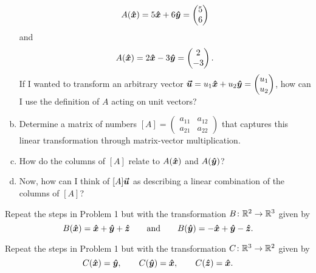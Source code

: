 \documentclass[12pt]{article} %
\begin{document}
\begin{problem}
\begin{enumerate}[(a)]
\[            A(\boldsymbol{\hat{x}}) = 5 \boldsymbol{\hat{x}} + 6\boldsymbol{\hat{y}} = \begin{pmatrix} 5 \\ 6 \end{pmatrix}
        \]
        and
        \[
            A(\boldsymbol{\hat{x}}) = 2 \boldsymbol{\hat{x}} - 3 \boldsymbol{\hat{y}} = \begin{pmatrix} 2 \\ -3 \end{pmatrix}.
        \]
        If I wanted to transform an arbitrary vector $\boldsymbol{\boldsymbol{\vec{u}}} = u_1 \boldsymbol{\hat{x}} + u_2 \boldsymbol{\hat{y}} = \begin{pmatrix} u_1 \\ u_2 \end{pmatrix}$, how can I use the definition of $A$ acting on unit vectors?
        \item Determine a matrix of numbers $[A] = \begin{pmatrix} a_{11} & a_{12} \\ a_{21} & a_{22} \end{pmatrix}$ that captures this linear transformation through matrix-vector multiplication. 
        \item How do the columns of $[A]$ relate to $A(\boldsymbol{\hat{x}})$ and $A(\boldsymbol{\hat{y}})$?
        \item Now, how can I think of $[A]\boldsymbol{\boldsymbol{\vec{u}}}$ as describing a linear combination of the columns of $[A]$?
    \end{enumerate}
\end{problem}

\begin{problem}
    Repeat the steps in Problem 1 but with the transformation $B \colon \mathbb{R}^2 \to \mathbb{R}^3$ given by
    \[
        B(\boldsymbol{\hat{x}}) = \boldsymbol{\hat{x}} + \boldsymbol{\hat{y}} + \boldsymbol{\hat{z}} \qquad \textrm{and} \qquad B(\boldsymbol{\hat{y}}) = -\boldsymbol{\hat{x}} + \boldsymbol{\hat{y}} - \boldsymbol{\hat{z}}.
    \]
\end{problem}

\begin{problem}
    Repeat the steps in Problem 1 but with the transformation $C\colon \mathbb{R}^3 \to \mathbb{R}^2$ given by
    \[
        C(\boldsymbol{\hat{x}}) = \boldsymbol{\hat{y}}, \qquad C(\boldsymbol{\hat{y}}) = \boldsymbol{\hat{x}}, \qquad C(\boldsymbol{\hat{z}}) = \boldsymbol{\hat{x}}.
    \]
\end{problem}
\end{document}
